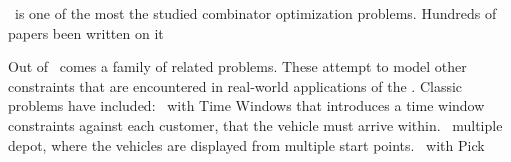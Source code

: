 
\VRP\ is one of the most the studied combinator optimization problems. Hundreds of papers been written on it  

Out of \VRP\ comes a family of related problems. These attempt to model other constraints that are encountered in real-world applications of the \VRP. Classic problems have included: \VRP\ with Time Windows that introduces a time window constraints  against each customer, that the vehicle must arrive within. \VRP\ multiple depot, where the vehicles are displayed from multiple start points. \VRP\ with Pick   

\subsection{\VRPTW}

